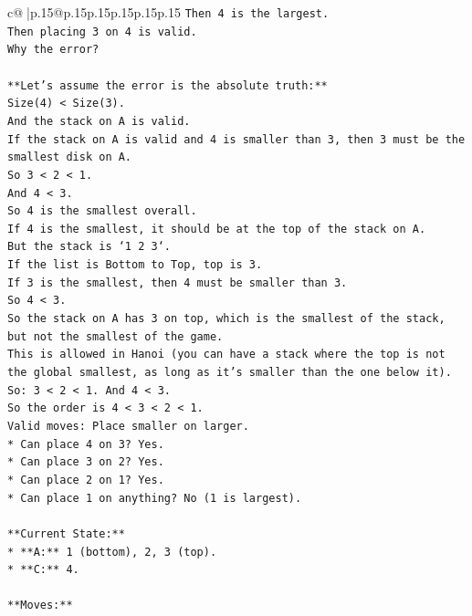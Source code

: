 \documentclass{article}
\begin{document}
{\begin{supertabular}{c@{$\;$}|p{.15\linewidth}@{}p{.15\linewidth}p{.15\linewidth}p{.15\linewidth}p{.15\linewidth}p{.15\linewidth}}
{{{\texttt{Then 4 is the largest.} \\
\texttt{Then placing 3 on 4 is valid.} \\
\texttt{Why the error?} \\
\\ 
\texttt{**Let's assume the error is the absolute truth:**} \\
\texttt{Size(4) < Size(3).} \\
\texttt{And the stack on A is valid.} \\
\texttt{If the stack on A is valid and 4 is smaller than 3, then 3 must be the smallest disk on A.} \\
\texttt{So 3 < 2 < 1.} \\
\texttt{And 4 < 3.} \\
\texttt{So 4 is the smallest overall.} \\
\texttt{If 4 is the smallest, it should be at the top of the stack on A.} \\
\texttt{But the stack is `1 2 3`.} \\
\texttt{If the list is Bottom to Top, top is 3.} \\
\texttt{If 3 is the smallest, then 4 must be smaller than 3.} \\
\texttt{So 4 < 3.} \\
\texttt{So the stack on A has 3 on top, which is the smallest of the stack, but not the smallest of the game.} \\
\texttt{This is allowed in Hanoi (you can have a stack where the top is not the global smallest, as long as it's smaller than the one below it).} \\
\texttt{So: 3 < 2 < 1. And 4 < 3.} \\
\texttt{So the order is 4 < 3 < 2 < 1.} \\
\texttt{Valid moves: Place smaller on larger.} \\
\texttt{*   Can place 4 on 3? Yes.} \\
\texttt{*   Can place 3 on 2? Yes.} \\
\texttt{*   Can place 2 on 1? Yes.} \\
\texttt{*   Can place 1 on anything? No (1 is largest).} \\
\\ 
\texttt{**Current State:**} \\
\texttt{*   **A:** 1 (bottom), 2, 3 (top).} \\
\texttt{*   **C:** 4.} \\
\\ 
\texttt{**Moves:**} \\
}}}
\end{supertabular}}
\end{document}

